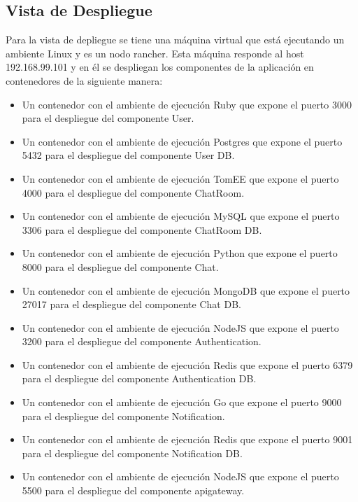 \subsection{Vista de Despliegue}
Para la vista de depliegue se tiene una máquina virtual que está ejecutando un ambiente Linux y es un nodo rancher. Esta máquina responde al host 192.168.99.101 y en él se despliegan los componentes de la aplicación en contenedores de la siguiente manera:
\begin{itemize}
    \item Un contenedor con el ambiente de ejecución Ruby que expone el puerto 3000 para el despliegue del componente User.
    \item Un contenedor con el ambiente de ejecución Postgres que expone el puerto 5432 para el despliegue del componente User DB.
    \item Un contenedor con el ambiente de ejecución TomEE que expone el puerto 4000 para el despliegue del componente ChatRoom.
    \item Un contenedor con el ambiente de ejecución MySQL que expone el puerto 3306 para el despliegue del componente ChatRoom DB.
    \item Un contenedor con el ambiente de ejecución Python que expone el puerto 8000 para el despliegue del componente Chat.
    \item Un contenedor con el ambiente de ejecución MongoDB que expone el puerto 27017 para el despliegue del componente Chat DB.
    \item Un contenedor con el ambiente de ejecución NodeJS que expone el puerto 3200 para el despliegue del componente Authentication.
    \item Un contenedor con el ambiente de ejecución Redis que expone el puerto 6379 para el despliegue del componente Authentication DB.
    \item Un contenedor con el ambiente de ejecución Go que expone el puerto 9000 para el despliegue del componente Notification.
    \item Un contenedor con el ambiente de ejecución Redis que expone el puerto 9001 para el despliegue del componente Notification DB.
    \item Un contenedor con el ambiente de ejecución NodeJS que expone el puerto 5500 para el despliegue del componente api\textunderscore gateway.
\end{itemize}

